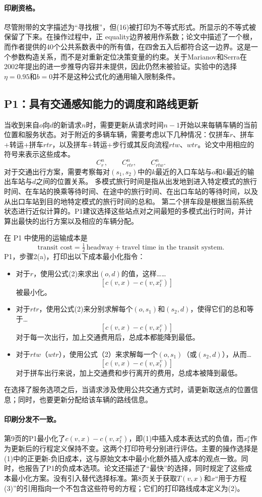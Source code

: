 \documentclass{article}
\begin{document}
\paragraph{印刷资格。}
尽管附带的文字描述为“寻找根”，但(16)被打印为不等式形式。所显示的不等式被保留了下来。在操作过程中，正 equality边界被用作系数；论文中描述了一个根，而作者提供的40个公共系数表中的所有值，在四舍五入后都符合这一边界。这是一个参数构造关系，而不是对重新定位决策变量的约束。关于Marianov和Serra在2002年提出的进一步推导内容并未提供，因此仍然未被验证。实验中的选择$\eta=0.95$和$b=0$并不是这种公式化的通用输入限制条件。

\subsection*{P1：具有交通感知能力的调度和路线更新}
当收到来自$o$向$d$的新请求$n$时，需要更新从请求时间$n-1$开始以来每辆车辆的当前位置和服务状态。对于附近的多辆车辆，需要考虑以下几种情况：仅拼车$r$、拼车+转运+拼车$rtr$，以及拼车+转运+步行或其反向流程$rtw$、$wtr$。论文中用相应的符号来表示这些成本。
\[
C_r^n,\qquad C_{rtr}^n,\qquad C_{rtw}^n.
\]
对于交通出行方案，需要考察每对$(s_1,s_2)$中的$k$最近的入口车站与$o$和$k$最近的输出车站与$d$之间的位置关系。 多模式旅行时间是指从出发地到进入特定模式的旅行时间、在车站的换乘等待时间、在途中的旅行时间、在出口车站的等待时间，以及从出口车站到目的地特定模式的旅行时间的总和。 第二个拼车段是根据当前系统状态进行近似计算的。P1建议选择这些站点对之间最短的多模式出行时间，并计算出最快的出行方案以及相应的车辆分配。

在 P1 中使用的运输成本是
\[
\text{transit cost}
=\tfrac12\,\text{headway}+\text{travel time in the transit system}.
\]
P1，步骤2(a)，打印出以下成本最小化指令：
\begin{itemize}
\item 对于$r$，使用公式(2)来求出$(o,d)$的值，这样……
\[
[c(v,x)-c(v,x_t^v)]
\]
被最小化。
\item 对于$rtr$，使用公式(2)来分别求解每个$(o,s_1)$和$(s_2,d)$，使得它们的总和等于…
\[
[c(v,x)-c(v,x_t^v)]
\]
对于每一次出行，加上交通费用后，总成本都能降到最低。
\item 对于$rtw$（$wtr$），使用公式（2）来求解每一个$(o,s_1)$（或$(s_2,d)$），从而…
\[
[c(v,x)-c(v,x_t^v)]
\]
对于拼车出行来说，加上交通费和步行离开的费用，总成本被降到最低。
\end{itemize}
在选择了服务选项之后，当请求涉及使用公共交通方式时，请更新取送点的位置信息；同时，也要更新分配给该车辆的路线信息。

\paragraph{印刷分发不一致。}
第9页的P1最小化了$c(v,x)-c(v,x_t^v)$，即(1)中插入成本表达式的负值，而$x_t^v$作为更新后的行程定义保持不变。这两个打印符号分别进行评估。主要的操作选择是(1)中的正更新-负旧成本，这与原始文本中最小化额外插入成本的观点一致。同时，也报告了P1的负成本选项。论文还描述了“最快”的选择，同时规定了这些成本最小化方案。没有引入替代选择标准。第8页关于获取$T(v,x)$和$x$“用于方程(3)”的引用指向一个不包含这些符号的方程；它们的打印路线成本定义为(2)。
\end{document}

